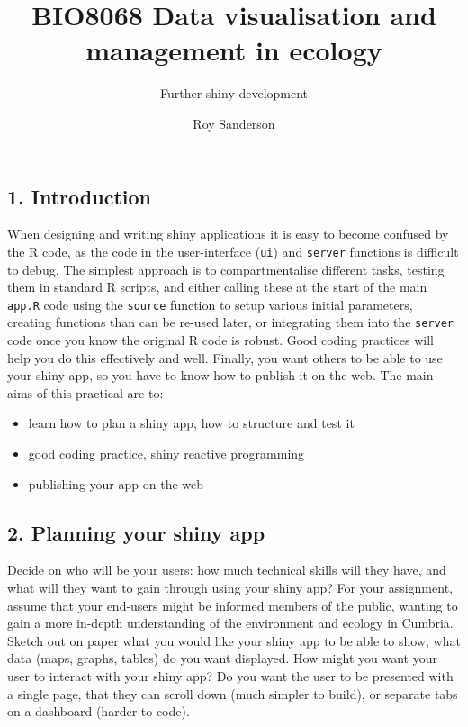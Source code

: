 \documentclass[]{article}
\title{BIO8068 Data visualisation and management in ecology}
\subtitle{Further shiny development}
\author{Roy Sanderson}
\date{}
\providecommand{\tightlist}{%
  \setlength{\itemsep}{0pt}\setlength{\parskip}{0pt}}
\begin{document}
\maketitle

\subsection{1. Introduction}\label{introduction}

When designing and writing shiny applications it is easy to become
confused by the R code, as the code in the user-interface (\texttt{ui})
and \texttt{server} functions is difficult to debug. The simplest
approach is to compartmentalise different tasks, testing them in
standard R scripts, and either calling these at the start of the main
\texttt{app.R} code using the \texttt{source} function to setup various
initial parameters, creating functions than can be re-used later, or
integrating them into the \texttt{server} code once you know the
original R code is robust. Good coding practices will help you do this
effectively and well. Finally, you want others to be able to use your
shiny app, so you have to know how to publish it on the web. The main
aims of this practical are to:

\begin{itemize}
\tightlist
\item
  learn how to plan a shiny app, how to structure and test it
\item
  good coding practice, shiny reactive programming
\item
  publishing your app on the web
\end{itemize}

\subsection{2. Planning your shiny app}\label{planning-your-shiny-app}

Decide on who will be your users: how much technical skills will they
have, and what will they want to gain through using your shiny app? For
your assignment, assume that your end-users might be informed members of
the public, wanting to gain a more in-depth understanding of the
environment and ecology in Cumbria. Sketch out on paper what you would
like your shiny app to be able to show, what data (maps, graphs, tables)
do you want displayed. How might you want your user to interact with
your shiny app? Do you want the user to be presented with a single page,
that they can scroll down (much simpler to build), or separate tabs on a
dashboard (harder to code).
\end{document}
